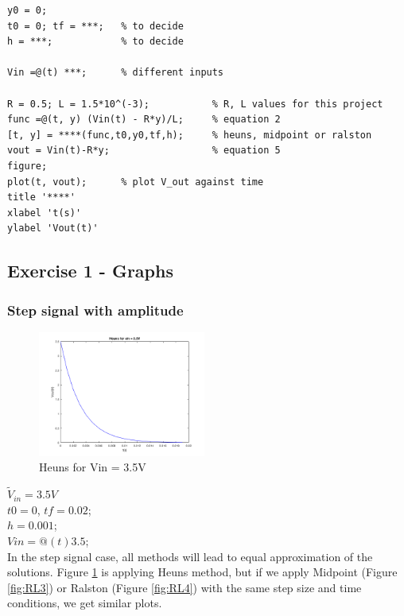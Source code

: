 \documentclass[11pt,a4paper]{article}
\begin{document}
\begin{verbatim}
y0 = 0;
t0 = 0; tf = ***;   % to decide
h = ***;            % to decide

Vin =@(t) ***;      % different inputs

R = 0.5; L = 1.5*10^(-3);           % R, L values for this project
func =@(t, y) (Vin(t) - R*y)/L;     % equation 2
[t, y] = ****(func,t0,y0,tf,h);     % heuns, midpoint or ralston
vout = Vin(t)-R*y;                  % equation 5
figure;
plot(t, vout);      % plot V_out against time
title '****'
xlabel 't(s)'
ylabel 'Vout(t)'

\end{verbatim}
\newpage
\subsection{Exercise 1 - Graphs}
\subsubsection{Step signal with amplitude}
\begin{figure}
        \vspace{-15mm}
        \includegraphics[width=0.49\textwidth]{Ex1_Figs/heuns_step.png}
        \vspace{-6mm}
        \caption{Heuns for Vin = 3.5V}
        \label{fig:RL2}
    \end{figure}

$\tilde{V}_{in} = 3.5V$ \\
    $t0 = 0$, $tf = 0.02$; \\
    $h = 0.001$; \\
    $Vin = @(t) 3.5$; \\

In the step signal case, all methods will lead to equal approximation of the solutions. Figure \ref{fig:RL2} is applying Heuns method, but if we apply Midpoint (Figure \ref{fig:RL3}) or Ralston (Figure \ref{fig:RL4}) with the same step size and time conditions, we get similar plots.
\end{document}
